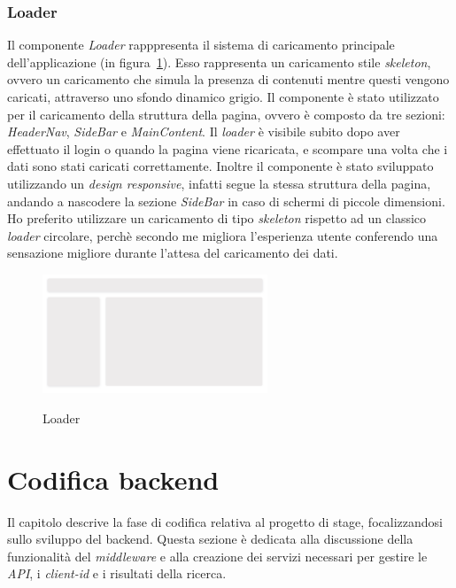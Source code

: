 \subsubsection{Loader}\label{subsubsec:loader}
Il componente \textit{Loader} rapppresenta il sistema di caricamento principale dell'applicazione (in figura~\ref{fig:loader}).
Esso rappresenta un caricamento stile \textit{skeleton}, ovvero un caricamento che simula la presenza di contenuti mentre questi vengono caricati, attraverso 
uno sfondo dinamico grigio.
Il componente è stato utilizzato per il caricamento della struttura della pagina, ovvero è composto da tre sezioni: \textit{HeaderNav}, \textit{SideBar} e
\textit{MainContent}. Il \textit{loader} è visibile subito dopo aver effettuato il login o quando la pagina viene ricaricata, e scompare una volta che i dati sono stati caricati correttamente.
Inoltre il componente è stato sviluppato utilizzando un \textit{design responsive}, infatti segue la stessa struttura della pagina, andando a nascodere la sezione 
\textit{SideBar} in caso di schermi di piccole dimensioni.
Ho preferito utilizzare un caricamento di tipo \textit{skeleton} rispetto ad un classico \textit{loader} circolare, perchè secondo me migliora l'esperienza utente 
conferendo una sensazione migliore durante l'attesa del caricamento dei dati.

\begin{figure}[ht]
  \centering
  \includegraphics[width=0.6\textwidth, alt={Skeleton loader di caricamento principale dell'applicazione}]{images/frontend/Loader.jpg}
  \caption{Loader}\label{fig:loader}
\end{figure}
\pagebreak

\section{Codifica backend}\label{sec:codifica-backend}
Il capitolo descrive la fase di codifica relativa al progetto di stage, focalizzandosi sullo sviluppo del backend. Questa sezione è dedicata alla discussione 
della funzionalità del \textit{middleware} e alla creazione dei servizi necessari per gestire le \textit{API}, i \textit{client-id} e i risultati della ricerca.



